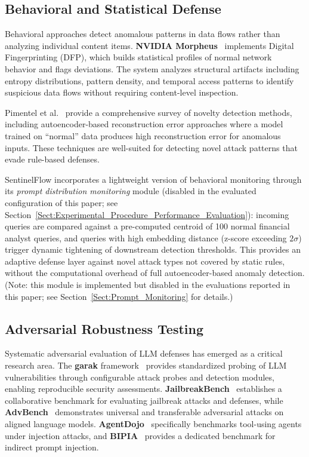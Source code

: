 \documentclass[journal]{IEEEtran}
\begin{document}
\subsection{Behavioral and Statistical Defense}
\label{Sect:LR_Behavioral}

Behavioral approaches detect anomalous patterns in data flows rather than analyzing individual content items. \textbf{NVIDIA Morpheus}~\cite{nvidia_morpheus} implements Digital Fingerprinting (DFP), which builds statistical profiles of normal network behavior and flags deviations. The system analyzes structural artifacts including entropy distributions, pattern density, and temporal access patterns to identify suspicious data flows without requiring content-level inspection.

Pimentel et al.~\cite{pimentel_novelty} provide a comprehensive survey of novelty detection methods, including autoencoder-based reconstruction error approaches where a model trained on ``normal'' data produces high reconstruction error for anomalous inputs. These techniques are well-suited for detecting novel attack patterns that evade rule-based defenses.

SentinelFlow incorporates a lightweight version of behavioral monitoring through its \textit{prompt distribution monitoring} module (disabled in the evaluated configuration of this paper; see Section~\ref{Sect:Experimental_Procedure_Performance_Evaluation}): incoming queries are compared against a pre-computed centroid of 100 normal financial analyst queries, and queries with high embedding distance (z-score exceeding $2\sigma$) trigger dynamic tightening of downstream detection thresholds. This provides an adaptive defense layer against novel attack types not covered by static rules, without the computational overhead of full autoencoder-based anomaly detection. (Note: this module is implemented but disabled in the evaluations reported in this paper; see Section~\ref{Sect:Prompt_Monitoring} for details.)

\subsection{Adversarial Robustness Testing}
\label{Sect:LR_Adversarial}

Systematic adversarial evaluation of LLM defenses has emerged as a critical research area. The \textbf{garak} framework~\cite{garak_paper, garak_github} provides standardized probing of LLM vulnerabilities through configurable attack probes and detection modules, enabling reproducible security assessments. \textbf{JailbreakBench}~\cite{jailbreakbench} establishes a collaborative benchmark for evaluating jailbreak attacks and defenses, while \textbf{AdvBench}~\cite{advbench} demonstrates universal and transferable adversarial attacks on aligned language models. \textbf{AgentDojo}~\cite{agentdojo} specifically benchmarks tool-using agents under injection attacks, and \textbf{BIPIA}~\cite{bipia} provides a dedicated benchmark for indirect prompt injection.
\end{document}
